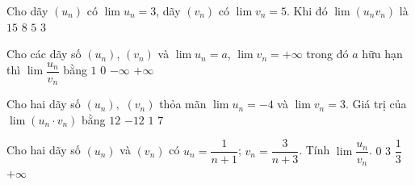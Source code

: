 \begin{ex}%
	Cho dãy $\left(u_n\right)$ có $\lim u_n=3$, dãy $\left(v_n\right)$ có $\lim v_n=5$. Khi đó $\lim\left(u_nv_n\right)$  là
	\choice 
		{\True  $15$}
		 {$8$}
		 {$5$}
		 {$3$}
\end{ex}

\begin{ex}%
	Cho các  dãy số $\left(u_n\right)$, $\left(v_n\right)$ và $\lim{u_n}=a$, $\lim{v_n}=+\infty$ trong đó $a$ hữu hạn thì $\lim\dfrac{u_n}{v_n}$ bằng
	\choice 
		 {$1$}
		{\True  $0$}
		 {$-\infty $}
		{$+\infty $} 
\end{ex}

\begin{ex}%
	Cho hai dãy số $\left(u_n\right),$ $\left(v_n\right)$ thỏa mãn $\lim u_n=-4$ và $\lim v_n=3$. Giá trị của $\lim\left(u_n  \cdot v_n\right)$ bằng
	 \choice
		 {$12$}
		 {\True $-12$}
		{$1$} 
		{$7$} 
\end{ex}

\begin{ex}%
	Cho hai dãy số $\left(u_n\right)$ và  $\left(v_n\right)$ có $u_n=\dfrac{1}{n+1}$; $v_n=\dfrac{3}{n+3}$. Tính $\lim\dfrac{u_n}{v_n}$.
	 \choice
		 {$0$}
		 {$ 3$}
		{\True  $\dfrac{1}{3}$}
		 {$+\infty $}
\end{ex}

